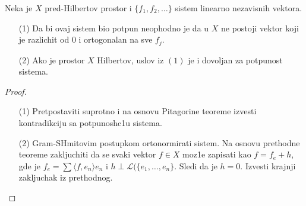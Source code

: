 \documentclass[a4paper,12pt]{article}
\begin{document}
\begin{tma}
Neka je $X$ pred-Hilbertov prostor i $\{f_1, f_2, \dots\}$ sistem linearno nezavisnih vektora.
\begin{itemize}
\item[(1)] Da bi ovaj sistem bio potpun neophodno je da u $X$ ne postoji vektor koji je razlichit od $0$ i ortogonalan na sve $f_j$.
\item[(2)] Ako je prostor $X$ Hilbertov, uslov iz $(1)$ je i dovoljan za potpunost sistema.
\end{itemize}
\end{tma}
\begin{proof}
\begin{itemize}
\item[(1)] Pretpostaviti suprotno i na osnovu Pitagorine teoreme izvesti kon\-tra\-dik\-ci\-ju sa potpunosh\-c1u sistema.
\item[(2)] Gram-SHmitovim postupkom ortonormirati sistem. Na osnovu prethodne teoreme zakljuchiti da se svaki vektor $f \in X$ moz1e zapisati kao $f = f_e + h$, gde je $f_e = \sum \langle f, e_n \rangle e_n$ i $h \perp \mathcal{L}(\{e_1, \dots, e_n\}$. Sledi da je $h = 0$. Izvesti krajnji zakljuchak iz prethodnog.
\end{itemize}
\end{proof}
\end{document}
